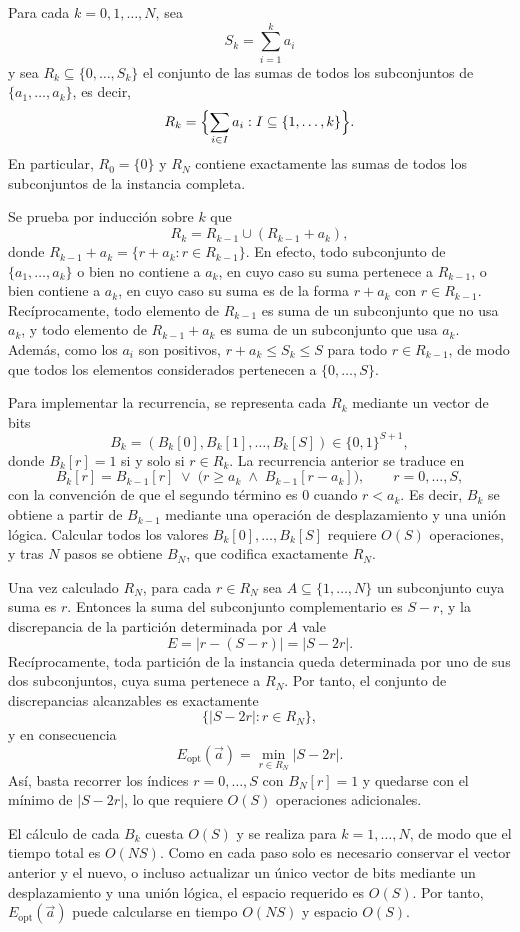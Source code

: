 \begin{demostracion}
	Para cada $k=0,1,\ldots,N$, sea
	\[
	S_k=\sum_{i=1}^{k}a_i
	\]
	y sea $R_k\subseteq\{0,\ldots,S_k\}$ el conjunto de las sumas de todos los subconjuntos de $\{a_1,\ldots,a_k\}$, es decir,
	\[
	R_k=\Bigl\{\sum_{i\in I}a_i : I\subseteq\{1,\ldots,k\}\Bigr\}.
	\]
	En particular, $R_0=\{0\}$ y $R_N$ contiene exactamente las sumas de todos los subconjuntos de la instancia completa.
	
	Se prueba por inducción sobre $k$ que
	\[
	R_k=R_{k-1}\cup (R_{k-1}+a_k),
	\]
	donde $R_{k-1}+a_k=\{r+a_k : r\in R_{k-1}\}$. En efecto, todo subconjunto de $\{a_1,\ldots,a_k\}$ o bien no contiene a $a_k$, en cuyo caso su suma pertenece a $R_{k-1}$, o bien contiene a $a_k$, en cuyo caso su suma es de la forma $r+a_k$ con $r\in R_{k-1}$. Recíprocamente, todo elemento de $R_{k-1}$ es suma de un subconjunto que no usa $a_k$, y todo elemento de $R_{k-1}+a_k$ es suma de un subconjunto que usa $a_k$. Además, como los $a_i$ son positivos, $r+a_k\leq S_k\leq S$ para todo $r\in R_{k-1}$, de modo que todos los elementos considerados pertenecen a $\{0,\ldots,S\}$.
	
	Para implementar la recurrencia, se representa cada $R_k$ mediante un vector de bits
	\[
	B_k=(B_k[0],B_k[1],\ldots,B_k[S])\in\{0,1\}^{S+1},
	\]
	donde $B_k[r]=1$ si y solo si $r\in R_k$. La recurrencia anterior se traduce en
	\[
	B_k[r]
	=
	B_{k-1}[r]
	\;\lor\;
	\bigl(r\geq a_k \;\land\; B_{k-1}[r-a_k]\bigr),
	\qquad r=0,\ldots,S,
	\]
	con la convención de que el segundo término es $0$ cuando $r<a_k$. Es decir, $B_k$ se obtiene a partir de $B_{k-1}$ mediante una operación de desplazamiento y una unión lógica. Calcular todos los valores $B_k[0],\ldots,B_k[S]$ requiere $O(S)$ operaciones, y tras $N$ pasos se obtiene $B_N$, que codifica exactamente $R_N$.
	
	Una vez calculado $R_N$, para cada $r\in R_N$ sea $A\subseteq\{1,\ldots,N\}$ un subconjunto cuya suma es $r$. Entonces la suma del subconjunto complementario es $S-r$, y la discrepancia de la partición determinada por $A$ vale
	\[
	E
	=
	\lvert r-(S-r)\rvert
	=
	\lvert S-2r\rvert.
	\]
	Recíprocamente, toda partición de la instancia queda determinada por uno de sus dos subconjuntos, cuya suma pertenece a $R_N$. Por tanto, el conjunto de discrepancias alcanzables es exactamente
	\[
	\bigl\{\lvert S-2r\rvert : r\in R_N\bigr\},
	\]
	y en consecuencia
	\[
	E_{\mathrm{opt}}(\vec{a})
	=
	\min_{r\in R_N}\lvert S-2r\rvert.
	\]
	Así, basta recorrer los índices $r=0,\ldots,S$ con $B_N[r]=1$ y quedarse con el mínimo de $\lvert S-2r\rvert$, lo que requiere $O(S)$ operaciones adicionales.
	
	El cálculo de cada $B_k$ cuesta $O(S)$ y se realiza para $k=1,\ldots,N$, de modo que el tiempo total es $O(NS)$. Como en cada paso solo es necesario conservar el vector anterior y el nuevo, o incluso actualizar un único vector de bits mediante un desplazamiento y una unión lógica, el espacio requerido es $O(S)$. Por tanto, $E_{\mathrm{opt}}(\vec{a})$ puede calcularse en tiempo $O(NS)$ y espacio $O(S)$.
\end{demostracion}

